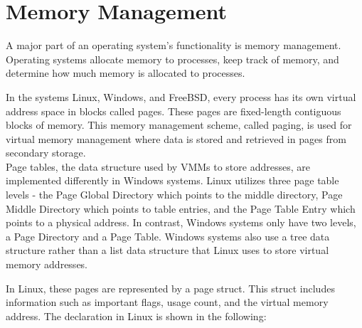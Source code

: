 \documentclass[journal, letterpaper, draftclsnofoot, onecolumn, 10pt]{IEEEtran}
\begin{document}
\section{Memory Management}

A major part of an operating system's functionality is memory management.
Operating systems allocate memory to processes, keep track of memory, and determine how much memory is allocated to processes.

In the systems Linux, Windows, and FreeBSD, every process has its own virtual address space in blocks called pages. These pages are fixed-length contiguous blocks of memory. This memory management scheme, called paging, is used for virtual memory management where data is stored and retrieved in pages from secondary storage. \\

Page tables, the data structure used by VMMs to store addresses, are implemented differently in Windows systems. Linux utilizes three page table levels - the Page Global Directory which points to the middle directory, Page Middle Directory which points to table entries, and the Page Table Entry which points to a physical address. In contrast, Windows systems only have two levels, a Page Directory and a Page Table.
Windows systems also use a tree data structure rather than a list data structure that Linux uses to store virtual memory addresses.

In Linux, these pages are represented by a page struct. This struct includes information such as important flags, usage count, and the virtual memory address. The declaration in Linux is shown in the following: \cite{pages}
\end{document}
